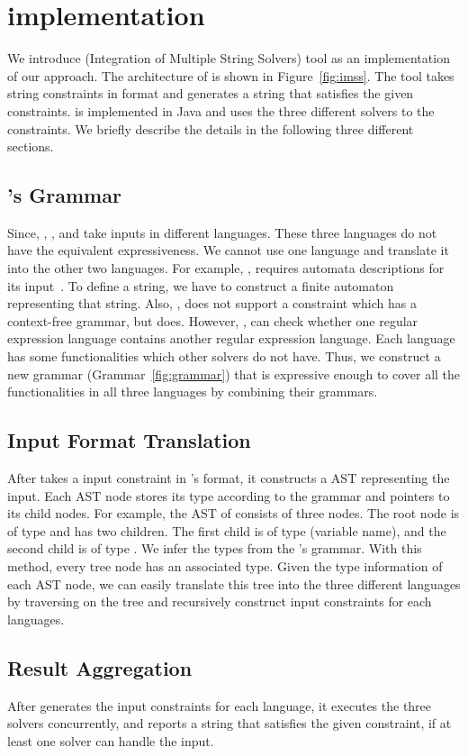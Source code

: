 \section{implementation}
\label{sec:implementation}
We introduce \imss (Integration of Multiple String Solvers) tool as
an implementation of our approach. The architecture of \imss is shown
in Figure~\ref{fig:imss}. The tool takes string constraints in \imss format
and generates a string that satisfies the given constraints. \imss is
implemented in Java and uses the three different solvers to the constraints.
We briefly describe the details in the following three different sections.

\subsection{\imss's Grammar}
Since, \hampi, \dprle, and \zstr take inputs in
 different languages. These three languages do not have the equivalent expressiveness.
 We cannot use one language and translate it into the other two languages. For example,
 \dprle, requires automata descriptions for its input~\cite{lazystrings2010}.
 To define a string, we have to construct a finite automaton representing that string.
 Also, \dprle, does not support a constraint which has a context-free grammar,
 but \hampi does. However, \dprle, can check whether one regular expression language
 contains another regular expression language. Each language has some functionalities which
 other solvers do not have. Thus, we construct a new grammar (Grammar~\ref{fig:grammar}) that is expressive enough to
 cover all the functionalities in all three languages by combining their grammars.

\subsection{Input Format Translation}
After \imss takes a input constraint in \imss's format, it constructs a AST representing the input.
Each AST node stores its type according to the grammar and pointers to its child nodes.
For example, the AST of  consists of three nodes. The root node is of type
 and has two children. The first child is of type  (variable name), and
the second child is of type . We infer the types from the \imss's grammar.
With this method, every tree node has an associated type. Given the type information of
each AST node, we can easily translate this tree into the three different languages by traversing
on the tree and recursively construct input constraints for each languages.

\subsection{Result Aggregation}
After \imss generates the input constraints for each language, it executes the three solvers concurrently, and
reports a string that satisfies the given constraint, if at least one solver can handle the input.
